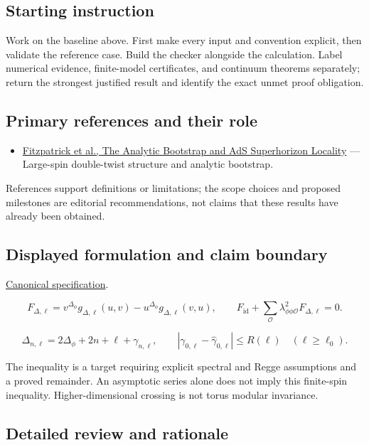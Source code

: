 \documentclass[
  11pt,
]{article}
\providecommand{\tightlist}{%
  \setlength{\itemsep}{0pt}\setlength{\parskip}{0pt}}
\begin{document}
\subsection{Starting instruction}

Work on the baseline above. First make every input and convention
explicit, then validate the reference case. Build the checker alongside
the calculation. Label numerical evidence, finite-model certificates,
and continuum theorems separately; return the strongest justified result
and identify the exact unmet proof obligation.

\subsection{Primary references and their role}

\begin{itemize}
\tightlist
\item
  \href{https://arxiv.org/abs/1212.3616}{Fitzpatrick et al., The
  Analytic Bootstrap and AdS Superhorizon Locality} --- Large-spin
  double-twist structure and analytic bootstrap.
\end{itemize}

References support definitions or limitations; the scope choices and
proposed milestones are editorial recommendations, not claims that these
results have already been obtained.

\subsection{Displayed formulation and claim boundary}

\href{https://github.com/rick-stevens-ai/Pure-Thought/blob/main/PRDs/04-Modular-Lightcone-Bootstrap.md}{Canonical
specification}.

\[F_{\Delta,\ell}=v^{\Delta_\phi}g_{\Delta,\ell}(u,v)
-u^{\Delta_\phi}g_{\Delta,\ell}(v,u),\qquad
F_{\mathrm{id}}+\sum_{\mathcal O}\lambda_{\phi\phi\mathcal O}^{2}F_{\Delta,\ell}=0.\]

\[\Delta_{n,\ell}=2\Delta_\phi+2n+\ell+\gamma_{n,\ell},\qquad
|\gamma_{0,\ell}-\widehat\gamma_{0,\ell}|\le R(\ell)\quad(\ell\ge\ell_0).\]

The inequality is a target requiring explicit spectral and Regge
assumptions and a proved remainder. An asymptotic series alone does not
imply this finite-spin inequality. Higher-dimensional crossing is not
torus modular invariance.

\subsection{Detailed review and rationale}
\end{document}
